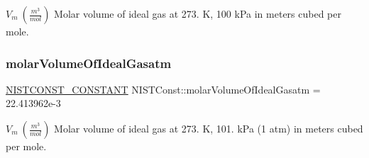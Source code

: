 $V_m \ (\frac{m^3}{mol})$ Molar volume of ideal gas at 273. K, 100 k\+Pa in meters cubed per mole. \mbox{\label{group___n_i_s_t_const-_molar_volume_gabc17d301cfbbfc12ffc1caa75c4a4602}} 
\subsubsection{\texorpdfstring{molar\+Volume\+Of\+Ideal\+Gasatm}{molarVolumeOfIdealGasatm}}
{\footnotesize\ttfamily \mbox{\hyperlink{_n_i_s_t_const_8hpp_a2b0fc1d7452373f816175dd86ce26729}{N\+I\+S\+T\+C\+O\+N\+S\+T\+\_\+\+C\+O\+N\+S\+T\+A\+NT}} N\+I\+S\+T\+Const\+::molar\+Volume\+Of\+Ideal\+Gasatm = 22.\+413962e-\/3}

$V_m \ (\frac{m^3}{mol})$ Molar volume of ideal gas at 273. K, 101. k\+Pa (1 atm) in meters cubed per mole. 